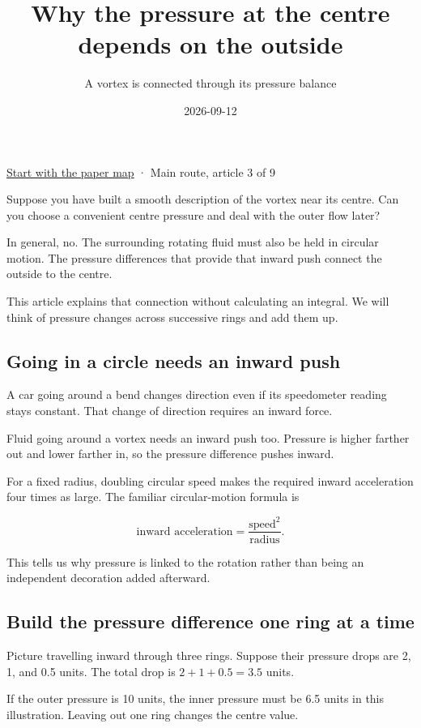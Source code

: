 \documentclass[
  english,
  11pt,
]{article}
\title{Why the pressure at the centre depends on the outside}
\subtitle{A vortex is connected through its pressure balance}
\author{}
\date{2026-09-12}
\begin{document}
\maketitle


\href{../paper-map/article.html}{Start with the paper map} · Main route,
article 3 of 9

Suppose you have built a smooth description of the vortex near its
centre. Can you choose a convenient centre pressure and deal with the
outer flow later?

In general, no. The surrounding rotating fluid must also be held in
circular motion. The pressure differences that provide that inward push
connect the outside to the centre.

This article explains that connection without calculating an integral.
We will think of pressure changes across successive rings and add them
up.

\subsection{Going in a circle needs an inward
push}\label{going-in-a-circle-needs-an-inward-push}

A car going around a bend changes direction even if its speedometer
reading stays constant. That change of direction requires an inward
force.

Fluid going around a vortex needs an inward push too. Pressure is higher
farther out and lower farther in, so the pressure difference pushes
inward.

For a fixed radius, doubling circular speed makes the required inward
acceleration four times as large. The familiar circular-motion formula
is

\[
\text{inward acceleration}=\frac{\text{speed}^2}{\text{radius}}.
\]

This tells us why pressure is linked to the rotation rather than being
an independent decoration added afterward.

\subsection{Build the pressure difference one ring at a
time}\label{build-the-pressure-difference-one-ring-at-a-time}

Picture travelling inward through three rings. Suppose their pressure
drops are 2, 1, and 0.5 units. The total drop is \(2+1+0.5=3.5\) units.

If the outer pressure is 10 units, the inner pressure must be 6.5 units
in this illustration. Leaving out one ring changes the centre value.
\end{document}
